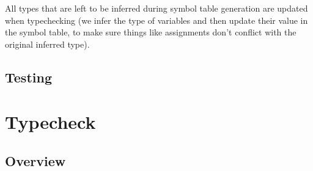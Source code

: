 \documentclass[11pt]{article}
\begin{document}
All types that are left to be inferred during symbol table
generation are updated when typechecking (we infer the type of
variables and then update their value in the symbol table, to make
sure things like assignments don't conflict with the original
inferred type).

\subsection{Testing}
\section{Typecheck}
\subsection{Overview}
\end{document}
